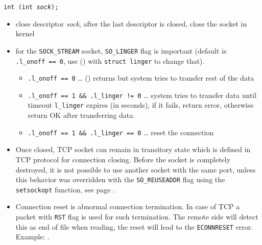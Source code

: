 

\begin{slide}
\setlength{\baselineskip}{0.8\baselineskip}
\texttt{int (int \emph{sock});}
\begin{itemize}
\item close descriptor \emph{sock}, after the last descriptor is closed, close
the socket in kernel
\item for the \texttt{SOCK\_STREAM} socket,
\texttt{SO\_LINGER} flag is important (default is \texttt{.l\_onoff~==~0}, use
() with \texttt{struct linger} to change that).
    \begin{itemize}
    \item \texttt{.l\_onoff~==~0} \dots{} () returns but system
    tries to transfer rest of the data
    \item \texttt{.l\_onoff~==~1~\&\&~.l\_linger~!=~0} \dots{} system tries to
    transfer data until timeout \texttt{l\_linger} expires (in seconds), if it
    fails, return error, otherwise return OK after transferring data.
    \item \texttt{.l\_onoff~==~1~\&\&~.l\_linger~==~0} \dots{} reset the
    connection
    \end{itemize}
\end{itemize}
\end{slide}

\label{CLOSESOCKET}

\begin{itemize}
\item Once closed, TCP socket can remain in transitory state which is defined in
TCP protocol for connection closing. Before the socket is completely destroyed,
it is not possible to use another socket with the same port, unless this
behavior was overridden with the \texttt{SO\_REUSEADDR} flag using the
\texttt{setsockopt} function, see page \pageref{SETSOCKOPT}.
\item Connection reset is abnormal connection termination. In case of TCP
a packet with \texttt{RST} flag is used for such termination. The remote side
will detect this as end of file when reading, the reset will lead to the
\texttt{ECONNRESET} error. Example: .
\end{itemize}



